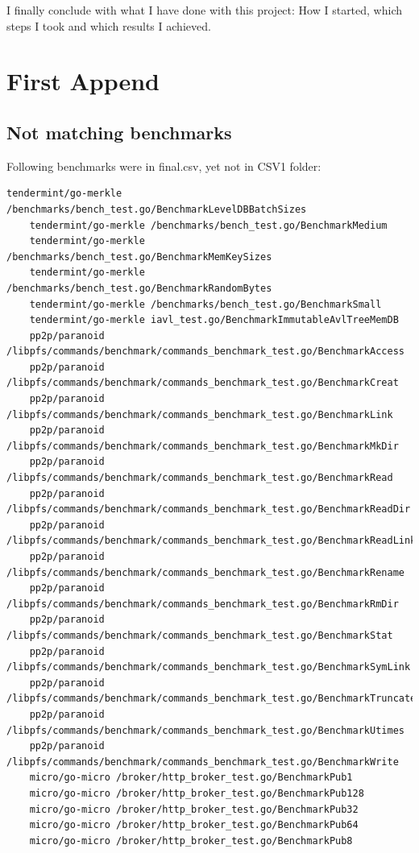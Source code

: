 \documentclass{seal_thesis}
\begin{document}
I finally conclude with what I have done with this project: How I started, which steps I took and which results I achieved.


\appendix
\chapter{First Append}
\section{Not matching benchmarks}
\label{infinalbutnotincsv1}
Following benchmarks were in final.csv, yet not in CSV1 folder:
\begin{lstlisting}[basicstyle=\tiny]
	tendermint/go-merkle /benchmarks/bench_test.go/BenchmarkLevelDBBatchSizes
	tendermint/go-merkle /benchmarks/bench_test.go/BenchmarkMedium
	tendermint/go-merkle /benchmarks/bench_test.go/BenchmarkMemKeySizes
	tendermint/go-merkle /benchmarks/bench_test.go/BenchmarkRandomBytes
	tendermint/go-merkle /benchmarks/bench_test.go/BenchmarkSmall
	tendermint/go-merkle iavl_test.go/BenchmarkImmutableAvlTreeMemDB
	pp2p/paranoid /libpfs/commands/benchmark/commands_benchmark_test.go/BenchmarkAccess
	pp2p/paranoid /libpfs/commands/benchmark/commands_benchmark_test.go/BenchmarkCreat
	pp2p/paranoid /libpfs/commands/benchmark/commands_benchmark_test.go/BenchmarkLink
	pp2p/paranoid /libpfs/commands/benchmark/commands_benchmark_test.go/BenchmarkMkDir
	pp2p/paranoid /libpfs/commands/benchmark/commands_benchmark_test.go/BenchmarkRead
	pp2p/paranoid /libpfs/commands/benchmark/commands_benchmark_test.go/BenchmarkReadDir
	pp2p/paranoid /libpfs/commands/benchmark/commands_benchmark_test.go/BenchmarkReadLink
	pp2p/paranoid /libpfs/commands/benchmark/commands_benchmark_test.go/BenchmarkRename
	pp2p/paranoid /libpfs/commands/benchmark/commands_benchmark_test.go/BenchmarkRmDir
	pp2p/paranoid /libpfs/commands/benchmark/commands_benchmark_test.go/BenchmarkStat
	pp2p/paranoid /libpfs/commands/benchmark/commands_benchmark_test.go/BenchmarkSymLink
	pp2p/paranoid /libpfs/commands/benchmark/commands_benchmark_test.go/BenchmarkTruncate
	pp2p/paranoid /libpfs/commands/benchmark/commands_benchmark_test.go/BenchmarkUtimes
	pp2p/paranoid /libpfs/commands/benchmark/commands_benchmark_test.go/BenchmarkWrite
	micro/go-micro /broker/http_broker_test.go/BenchmarkPub1
	micro/go-micro /broker/http_broker_test.go/BenchmarkPub128
	micro/go-micro /broker/http_broker_test.go/BenchmarkPub32
	micro/go-micro /broker/http_broker_test.go/BenchmarkPub64
	micro/go-micro /broker/http_broker_test.go/BenchmarkPub8

\end{lstlisting}
\end{document}

